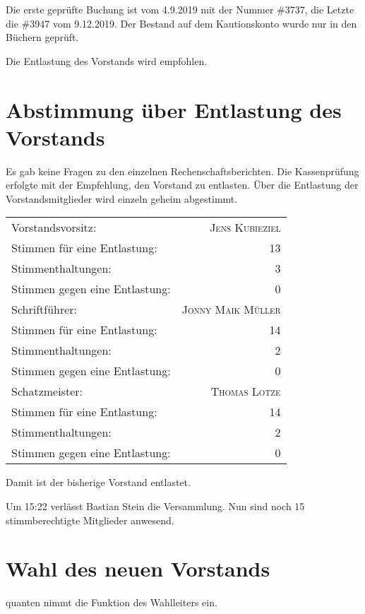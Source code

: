 \documentclass[DIV=calc,parksip=half*]{scrartcl}
\newcommand{\qbi}{Jens Kubieziel}
\newcommand{\jonny}{Jonny Maik Müller}
\newcommand{\thomas}{Thomas Lotze}
\newcommand{\quanten}{quanten}
\begin{document}
Die erste geprüfte Buchung ist vom 4.9.2019 mit der Nummer \#3737,
die Letzte die \#3947 vom 9.12.2019.
Der Bestand auf dem Kautionskonto wurde nur in den Büchern geprüft.

Die Entlastung des Vorstands wird empfohlen.

\section{Abstimmung über Entlastung des Vorstands}

Es gab keine Fragen zu den einzelnen Rechenschaftsberichten.
Die Kassenprüfung erfolgte mit der Empfehlung, den Vorstand zu entlasten.
Über die Entlastung der Vorstandsmitglieder wird einzeln geheim abgestimmt.

  \begin{tabularx}{\linewidth}{Xr}
    \toprule
    Vorstandsvorsitz: & \textsc{\qbi{}}\\
    Stimmen für eine Entlastung: & 13 \\
    Stimmenthaltungen: & 3 \\
    Stimmen gegen eine Entlastung: & 0\\
    \midrule
    Schriftführer: & \textsc{\jonny{}}\\
    Stimmen für eine Entlastung: & 14 \\
    Stimmenthaltungen: & 2 \\
    Stimmen gegen eine Entlastung: & 0\\
    \midrule
    Schatzmeister: & \textsc{\thomas{}}\\
    Stimmen für eine Entlastung: & 14 \\
    Stimmenthaltungen: & 2 \\
    Stimmen gegen eine Entlastung: & 0\\
    \bottomrule
\end{tabularx}
Damit ist der bisherige Vorstand entlastet.

Um 15:22 verlässt Bastian Stein die Versammlung. Nun sind noch 15 stimmberechtigte Mitglieder anwesend.

\section{Wahl des neuen Vorstands}

\quanten{} nimmt die Funktion des Wahlleiters ein.
\end{document}
